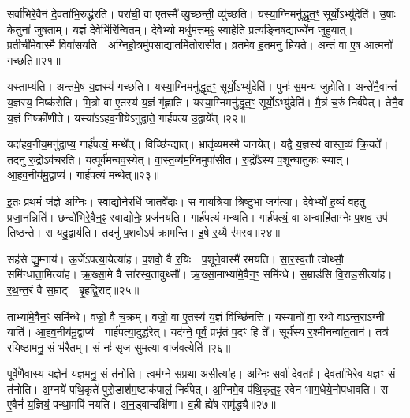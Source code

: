 सर्वा॑भिरे॒वैनं॑ दे॒वता॑भि॒रुद्ध॑रति।
परा॑ची॒ वा ए॒तस्मै᳚ व्यु॒च्छन्ती॒ व्यु॑च्छति।
यस्या॒ग्निमनु॑द्धृत॒ꣳ॒ सूर्यो॒\-ऽभ्यु॑देति॑।
उ॒षाः के॒तुना॑ जुषताम्।
य॒ज्ञं दे॒वेभि॑रिन्वि॒तम्।
दे॒वेभ्यो॒ मधु॑मत्तम॒ꣴ॒ स्वाहेति॑ प्र॒त्यङ्नि॒षद्याज्ये॑न जुहुयात्।
प्र॒तीची॑मे॒वास्मै॒ विवा॑सयति।
अ॒ग्नि॒हो॒त्रमु॑प॒साद्यातमि॑तोरासीत।
व्र॒तमे॒व ह॒तमनु॑ म्रियते।
अन्तं॒ वा ए॒ष आ॒त्मनो॑ गच्छति॥२१॥

यस्ताम्य॑ति।
अन्त॑मे॒ष य॒ज्ञस्य॑ गच्छति।
यस्या॒ग्निमनु॑द्धृत॒ꣳ॒ सूर्यो॒\-ऽभ्यु॑देति॑।
पुनः॑ स॒मन्य॑ जुहोति।
अन्ते॑नै॒वान्तं॑ य॒ज्ञस्य॒ निष्क॑रोति।
मि॒त्रो वा ए॒तस्य॑ य॒ज्ञं गृ॑ह्णाति।
यस्या॒ग्निमनु॑द्धृत॒ꣳ॒ सूर्यो॒\-ऽभ्यु॑देति॑।
मै॒त्रं च॒रुं निर्व॑पेत्।
तेनै॒व य॒ज्ञं निष्क्री॑णीते।
यस्या॑\-ऽऽहव॒नीये\-ऽनु॑द्वाते॒ गार्\mbox{}ह॑पत्य उ॒द्वाये᳚त्॥२२॥

यदा॑हव॒नीय॒मनु॑द्वाप्य॒ गार्\mbox{}ह॑पत्यं॒ मन्थे᳚त्।
वि\-च्छि॑न्द्यात्।
भ्रातृ॑व्यमस्मै जनयेत्।
यद्वै य॒ज्ञस्य॑ वास्त॒व्यं॑ क्रि॒यते᳚।
तदनु॑ रु॒द्रो\-ऽव॑चरति।
यत्पूर्व॑मन्वव॒स्येत्।
वा॒स्त॒व्य॑म॒ग्निमुपा॑सीत।
रु॒द्रो᳚ऽस्य प॒शून्घातु॑कः स्यात्।
आ॒ह॒व॒नीय॑मु॒द्वाप्य॑।
गार्\mbox{}ह॑पत्यं मन्थेत्॥२३॥

इ॒तः प्र॑थ॒मं ज॑ज्ञे अ॒ग्निः।
स्वाद्योने॒रधि॑ जा॒तवे॑दाः।
स गा॑यत्रि॒या त्रि॒ष्टुभा॒ जग॑त्या।
दे॒वेभ्यो॑ ह॒व्यं व॑हतु प्रजा॒नन्निति॑।
छन्दो॑भिरे॒वैन॒ꣴ॒ स्वाद्योनेः॒ प्रज॑नयति।
गार्\mbox{}ह॑पत्यं मन्थति।
गार्\mbox{}ह॑पत्यं॒ वा अन्वाहि॑ताग्नेः प॒शव॒ उप॑ तिष्ठन्ते।
स यदु॒द्वाय॑ति।
तदनु॑ प॒शवोऽप॑ क्रामन्ति।
इ॒षे र॒य्यै र॑मस्व॥२४॥

सह॑से द्यु॒म्नाय॑।
ऊ॒र्जे\-ऽपत्या॒येत्या॑ह।
प॒शवो॒ वै र॒यिः।
प॒शूने॒वास्मै॑ रमयति।
सा॒र॒स्व॒तौ त्वोथ्सौ॒ समि॑न्धाता॒मित्या॑ह।
ऋ॒ख्सा॒मे वै सा॑रस्व॒तावुथ्सौ᳚।
ऋ॒ख्सा॒माभ्या॑मे॒वैन॒ꣳ॒ समि॑न्धे।
स॒म्राड॑सि वि॒राड॒सीत्या॑ह।
र॒थ॒न्त॒रं वै स॒म्राट्।
बृ॒हद्वि॒राट्॥२५॥

ताभ्या॑मे॒वैन॒ꣳ॒ समि॑न्धे।
वज्रो॒ वै च॒क्रम्।
वज्रो॒ वा ए॒तस्य॑ य॒ज्ञं विच्छि॑नत्ति।
यस्यानो॑ वा॒ रथो॑ वाऽन्त॒रा\-ऽग्नी याति॑।
आ॒ह॒व॒नीय॑मु॒द्वाप्य॑।
गार्\mbox{}ह॑पत्या॒दुद्ध॑रेत्।
यद॑ग्ने॒ पूर्वं॒ प्रभृ॑तं प॒दꣳ हि ते᳚।
सूर्य॑स्य र॒श्मीनन्वा॑त॒तान॑।
तत्र॑ रयि॒ष्ठामनु॒ सं भ॑रै॒तम्।
सं नः॑ सृज सुम॒त्या वाज॑व॒त्येति॑॥२६॥

पूर्वे॑णै॒वास्य॑ य॒ज्ञेन॑ य॒ज्ञमनु॒ सं त॑नोति।
त्वम॑ग्ने स॒प्रथा॑ अ॒सीत्या॑ह।
अ॒ग्निः सर्वा॑ दे॒वताः᳚।
दे॒वता॑भिरे॒व य॒ज्ञꣳ सं त॑नोति।
अ॒ग्नये॑ पथि॒कृते॑ पुरो॒डाश॑म॒ष्टा\-क॑पालं॒ निर्व॑पेत्।
अ॒ग्निमे॒व प॑थि॒कृत॒ꣴ॒ स्वेन॑ भाग॒धेये॒नोप॑धावति।
स ए॒वैनं॑ य॒ज्ञियं॒ पन्था॒मपि॑ नयति।
अ॒न॒ड्वान्दक्षि॑णा।
व॒ही ह्ये॑ष समृ॑द्ध्यै॥२७॥

